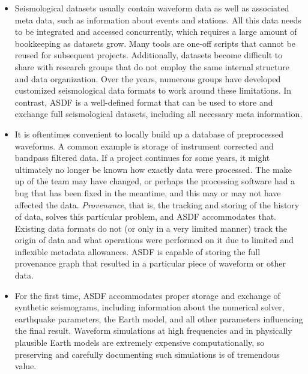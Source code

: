 \begin{itemize}

    \item Seismological datasets usually contain waveform data as well as
        associated meta data, such as information about events and stations.
        All this data needs to be integrated and accessed concurrently, which
        requires a large amount of bookkeeping as datasets grow. Many tools are
        one-off scripts that cannot be reused for subsequent
        projects. Additionally, datasets become difficult to share with
        research groups that do not employ the same internal structure and data
        organization. Over the years, numerous groups have developed customized
        seismological data formats to work around these limitations. In
        contrast, ASDF is a well-defined format that can be used
        to store and exchange full seismological datasets, including all
        necessary meta information.

    \item It is oftentimes convenient to locally build up a database of
        preprocessed waveforms. A common example is storage of instrument
        corrected and bandpass filtered data. If a project continues for some
        years, it might ultimately no longer be known how exactly data were
        processed. The make up of the team may have changed, or perhaps the
        processing software had a bug that has been fixed in the meantime, and
        this may or may not have affected the data.  \emph{Provenance}, that
        is, the tracking and storing of the history of data, solves this
        particular problem, and ASDF accommodates that. Existing data
        formats do not (or only in a very limited manner) track the origin of
        data and what operations were performed on it due to limited and
        inflexible metadata allowances. ASDF is capable of storing the
        full provenance graph that resulted in a particular piece of waveform
        or other data.

    \item For the first time, ASDF accommodates proper storage and
        exchange of synthetic seismograms, including information about the
        numerical solver, earthquake parameters, the Earth model, and all other
        parameters influencing the final result. Waveform simulations at high
        frequencies and in physically plausible Earth models are extremely
        expensive computationally, so preserving and carefully documenting such
        simulations is of tremendous value.


\end{itemize}
